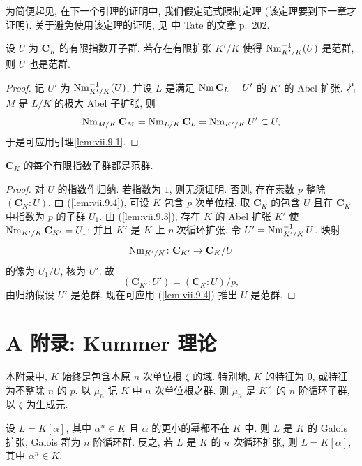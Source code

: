为简便起见, 在下一个引理的证明中, 我们假定范式限制定理 (该定理要到下一章才证明). 关于避免使用该定理的证明, 见 \cite{CasselsFrohlich1967} 中 Tate 的文章 p.~202.

\begin{lemma}\label{lem:vii.9.4}
设 $U$ 为 $\mathbf{C}_K$ 的有限指数开子群. 若存在有限扩张 $K'/K$ 使得 $\operatorname{Nm}_{K'/K}^{-1}(U)$ 是范群, 则 $U$ 也是范群.
\end{lemma}

\begin{proof}
记 $U'$ 为 $\operatorname{Nm}_{K'/K}^{-1}(U)$, 并设 $L$ 是满足 $\operatorname{Nm}\mathbf{C}_L=U'$ 的 $K'$ 的 Abel 扩张. 若 $M$ 是 $L/K$ 的极大 Abel 子扩张, 则
\[
\operatorname{Nm}_{M/K}\mathbf{C}_{M}=\operatorname{Nm}_{L/K}\mathbf{C}_{L}=\operatorname{Nm}_{K'/K}U'\subset U,
\]
于是可应用引理\ref{lem:vii.9.1}.
\end{proof}

\begin{theorem}\label{thm:vii.9.5}
$\mathbf{C}_K$ 的每个有限指数子群都是范群.
\end{theorem}

\begin{proof}
对 $U$ 的指数作归纳. 若指数为 $1$, 则无须证明. 否则, 存在素数 $p$ 整除 $(\mathbf{C}_K:U)$. 由 (\ref{lem:vii.9.4}), 可设 $K$ 包含 $p$ 次单位根. 取 $\mathbf{C}_K$ 的包含 $U$ 且在 $\mathbf{C}_K$ 中指数为 $p$ 的子群 $U_1$. 由 (\ref{lem:vii.9.3}), 存在 $K$ 的 Abel 扩张 $K'$ 使 $\operatorname{Nm}_{K'/K}\mathbf{C}_{K'}=U_1$; 并且 $K'$ 是 $K$ 上 $p$ 次循环扩张. 令 $U'=\operatorname{Nm}_{K'/K}^{-1}U$. 映射
\[
\operatorname{Nm}_{K'/K}\colon\mathbf{C}_{K'}\to\mathbf{C}_{K}/U
\]
的像为 $U_1/U$, 核为 $U'$. 故
\[
(\mathbf{C}_{K'}:U')=(\mathbf{C}_{K}:U)/p,
\]
由归纳假设 $U'$ 是范群. 现在可应用 (\ref{lem:vii.9.4}) 推出 $U$ 是范群.
\end{proof}

\section*{A 附录: Kummer 理论}
\renewcommand{\thetheorem}{A.\arabic{theorem}}
\setcounter{theorem}{0}

本附录中, $K$ 始终是包含本原 $n$ 次单位根 $\zeta$ 的域. 特别地, $K$ 的特征为 $0$, 或特征为不整除 $n$ 的 $p$. 以 $\mu_n$ 记 $K$ 中 $n$ 次单位根之群. 则 $\mu_n$ 是 $K^{\times}$ 的 $n$ 阶循环子群, 以 $\zeta$ 为生成元.

\begin{proposition}\label{prop:vii.A.1}
设 $L=K[\alpha]$, 其中 $\alpha^{n}\in K$ 且 $\alpha$ 的更小的幂都不在 $K$ 中. 则 $L$ 是 $K$ 的 Galois 扩张, Galois 群为 $n$ 阶循环群. 反之, 若 $L$ 是 $K$ 的 $n$ 次循环扩张, 则 $L=K[\alpha]$, 其中 $\alpha^{n}\in K$.
\end{proposition}

